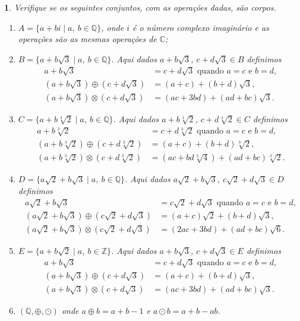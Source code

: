 \documentclass[12pt]{exam}
\newtheorem{exercicio}{}
\newcommand{\cp}[1]{\mathbb{#1}}
\begin{document}
\begin{exercicio}
Verifique se os seguintes conjuntos, com as operações dadas, s\~ao corpos.
\begin{enumerate}[label={\alph*})]
    \item $A = \{ a + bi \mid a,\ b \in \cp{Q}\}$, onde $i$ \'e o n\'umero complexo imagin\'ario e as operações são as mesmas operações de $\cp{C}$;
    \item $B = \{ a + b\sqrt{3} \mid a,\ b \in \cp{Q}\}$. Aqui dados $a + b\sqrt{3}$, $c + d\sqrt{3} \in B$ definimos
    \begin{align*}
      a + b\sqrt{3} &= c + d\sqrt{3} \mbox{ quando } a = c \mbox{ e } b = d,\\
      (a + b\sqrt{3}) \oplus (c + d\sqrt{3}) &= (a + c) + (b + d)\sqrt{3},\\
      (a + b\sqrt{3}) \otimes (c + d\sqrt{3}) &= (ac + 3bd) + (ad + bc)\sqrt{3}.
    \end{align*}
    \item $C = \{ a + b\sqrt[3]{2} \mid a,\ b \in \cp{Q}\}$. Aqui dados $a + b\sqrt[3]{2}$, $c + d\sqrt[3]{2} \in C$ definimos
    \begin{align*}
      a + b\sqrt[3]{2} &= c + d\sqrt[3]{2} \mbox{ quando } a = c \mbox{ e } b = d,\\
      (a + b\sqrt[3]{2}) \oplus (c + d\sqrt[3]{2}) &= (a + c) + (b + d)\sqrt[3]{2},\\
      (a + b\sqrt[3]{2}) \otimes (c + d\sqrt[3]{2}) &= (ac + bd\sqrt[3]{4}) + (ad + bc)\sqrt[3]{2}.
    \end{align*}
    \item $D = \{ a\sqrt{2} + b\sqrt{3} \mid a,\ b \in \cp{Q}\}$. Aqui dados $a\sqrt{2} + b\sqrt{3}$, $c\sqrt{2} + d\sqrt{3} \in D$ definimos
    \begin{align*}
      a\sqrt{2} + b\sqrt{3} &= c\sqrt{2} + d\sqrt{3} \mbox{ quando } a = c \mbox{ e } b = d,\\
      (a\sqrt{2} + b\sqrt{3}) \oplus (c\sqrt{2} + d\sqrt{3}) &= (a + c)\sqrt{2} + (b + d)\sqrt{3},\\
      (a\sqrt{2} + b\sqrt{3}) \otimes (c\sqrt{2} + d\sqrt{3}) &= (2ac + 3bd) + (ad + bc)\sqrt{6}.
    \end{align*}
    \item $E = \{ a + b\sqrt{2} \mid a,\ b \in \cp{Z}\}$. Aqui dados $a + b\sqrt{3}$, $c + d\sqrt{3} \in E$ definimos
    \begin{align*}
      a + b\sqrt{3} &= c + d\sqrt{3} \mbox{ quando } a = c \mbox{ e } b = d,\\
      (a + b\sqrt{3}) \oplus (c + d\sqrt{3}) &= (a + c) + (b + d)\sqrt{3},\\
      (a + b\sqrt{3}) \otimes (c + d\sqrt{3}) &= (ac + 3bd) + (ad + bc)\sqrt{3}.
    \end{align*}
    \item $(\cp{Q}, \oplus, \odot)$ onde $a \oplus b = a + b - 1$ e $a \odot b = a + b - ab$.
  \end{enumerate}  
\end{exercicio}
\end{document}
